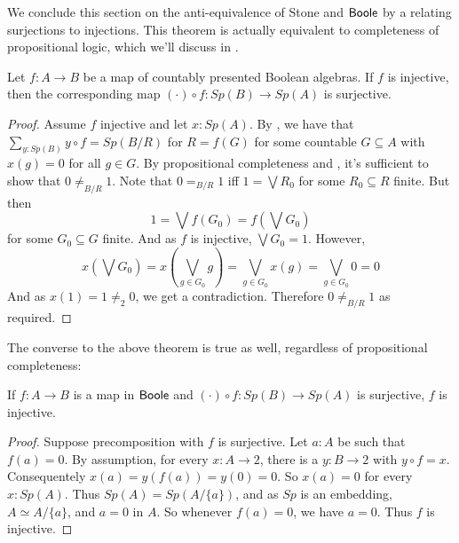 We conclude this section on the anti-equivalence of Stone and $\mathsf{Boole}$ by a relating surjections to injections. 
This theorem is actually equivalent to completeness of propositional logic, which we'll discuss in 
. 
\begin{theorem}\label{FormalSurjectionsAreSurjections}
  Let $f:A\to B$ be a map of countably presented Boolean algebras. 
  If $f$ is injective, then the corresponding map $(\cdot) \circ f : Sp(B) \to Sp(A)$ is surjective. 
\end{theorem}

\begin{proof}
  Assume $f$ injective and let $x:Sp(A)$.
  By , we have that $\sum\limits_{y:Sp(B)} y\circ f = Sp(B/R) $
  for $R=f(G)$ for some countable $G\subseteq A$ with $x(g) = 0$ for all $g\in G$. 
  By propositional completeness and , 
  it's sufficient to show that $0\neq_{B/R}1$. 
  Note that $0=_{B/R} 1$ iff 
  $1 = \bigvee R_0$ for some $R_0\subseteq R$ finite. 
  But then $$1 = \bigvee f(G_0) = f(\bigvee  G_0)$$ for some $G_0\subseteq G$ finite. 
  And as $f$ is injective, $\bigvee G_0 = 1$. 
  However, 
  $$
  x(\bigvee G_0) = 
  x(\bigvee_{g\in G_0} g ) = \bigvee_{g \in G_0} x(g) = \bigvee_{g\in G_0} 0 = 0$$
  And as $x(1) = 1 \neq_2 0$, we get a contradiction. Therefore $0\neq_{B/R} 1$ as required. 
\end{proof}  
The converse to the above theorem is true as well, regardless of propositional completeness:
\begin{lemma}\label{SurjectionsAreFormalSurjections}
If $f:A\to B$ is a map in $\mathsf{Boole}$ and $(\cdot) \circ f :Sp(B) \to Sp(A)$ is surjective, 
$f$ is injective. 
\end{lemma}
\begin{proof}
  Suppose precomposition with $f$ is surjective. 
  Let $a:A$ be such that $f(a)= 0$. 
  By assumption, for every $x:A\to 2$, there is a $y:B\to 2$ with $y\circ f = x$. 
  Consequentely $x(a) = y(f(a)) = y(0) = 0$. 
  So $x(a) = 0$ for every $x:Sp(A)$. 
  Thus $Sp(A) = Sp(A/\{a\})$, and as $Sp$ is an embedding, 
  $A \simeq A/\{a\}$, and $a = 0$ in $A$. 
  So whenever $f(a) = 0$, we have $a=0$. Thus $f$ is injective. 
\end{proof}
